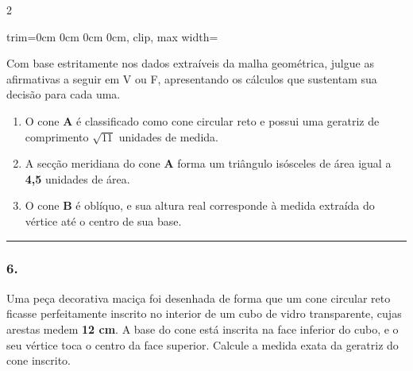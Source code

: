 \documentclass[twoside, 10pt, a4paper]{article}
\newlength{\espacoPreQuestao}\setlength{\espacoPreQuestao}{0.1cm}
\newlength{\espacoQuestao}\setlength{\espacoQuestao}{0.2cm}
\newlength{\espacoAlt}\setlength{\espacoAlt}{0.2cm}
\begin{document}
\begin{multicols*}{2}
\begin{center}
\begin{adjustbox}{trim=0cm 0cm 0cm 0cm, clip, max width=\linewidth}
\end{adjustbox}
\end{center}

Com base estritamente nos dados extraíveis da malha geométrica, julgue as afirmativas a seguir em V ou F, apresentando os cálculos que sustentam sua decisão para cada uma.

\begin{enumerate}[label=\Roman*., itemsep=\espacoAlt]
\item O cone \textbf{A} é classificado como cone circular reto e possui uma geratriz de comprimento $\sqrt{11}$ unidades de medida.
\item A secção meridiana do cone \textbf{A} forma um triângulo isósceles de área igual a \textbf{4,5} unidades de área.
\item O cone \textbf{B} é oblíquo, e sua altura real corresponde à medida extraída do vértice até o centro de sua base.
\end{enumerate}
\par\vspace{\espacoQuestao}

\noindent\textcolor{CorLinha}{\rule{\linewidth}{0.5pt}} 
\par\vspace{\espacoPreQuestao}
\subsubsection*{6.} Uma peça decorativa maciça foi desenhada de forma que um cone circular reto ficasse perfeitamente inscrito no interior de um cubo de vidro transparente, cujas arestas medem \textbf{12 cm}. A base do cone está inscrita na face inferior do cubo, e o seu vértice toca o centro da face superior. Calcule a medida exata da geratriz do cone inscrito.


\end{multicols*}
\end{document}
